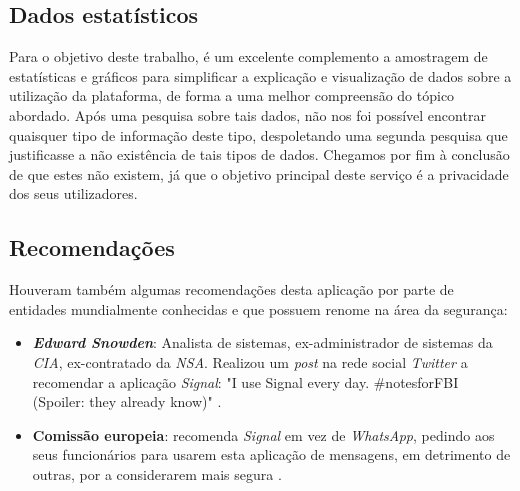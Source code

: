 \subsection{Dados estatísticos}
\label{sec:estatis}
Para o objetivo deste trabalho, é um excelente complemento a amostragem de estatísticas e gráficos para simplificar a explicação e visualização de dados sobre a utilização da plataforma, de forma a uma melhor compreensão do tópico abordado.
Após uma pesquisa sobre tais dados, não nos foi possível encontrar quaisquer tipo de informação deste tipo, despoletando uma segunda pesquisa que justificasse a não existência de tais tipos de dados. Chegamos por fim à conclusão de que estes não existem, já que o objetivo principal deste serviço é a privacidade dos seus utilizadores.


\subsection{Recomendações}
\label{sec:recomendacoes}
Houveram também algumas recomendações desta aplicação por parte de entidades mundialmente conhecidas e que possuem renome na área da segurança:
\begin{itemize}
    \item \textbf{\textit{Edward Snowden}}: Analista de sistemas, ex-administrador de sistemas da \textit{CIA}, ex-contratado da \textit{NSA}. Realizou um \textit{post} na rede social \textit{Twitter} a recomendar a aplicação \textit{Signal}: "I use Signal every day. \#notesforFBI (Spoiler: they already know)"  \cite{Snowden_tweet}.
    \item \textbf{Comissão europeia}: recomenda \textit{Signal} em vez de \textit{WhatsApp}, pedindo aos seus funcionários para usarem esta aplicação de mensagens, em detrimento de outras, por a considerarem mais segura \cite{publico_new}.
\end{itemize}
